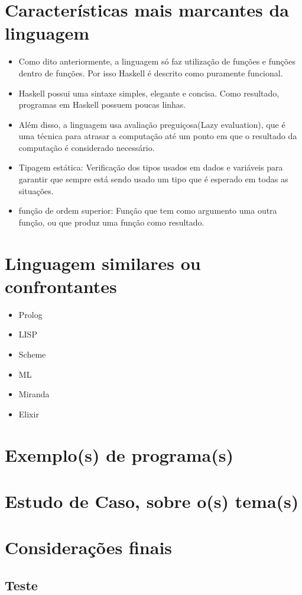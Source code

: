 \documentclass[
    article,			       %
    11pt,				         %
    oneside,			       %
    a4paper,			       %
    english,		       	 %
    brazil,			      	 %
    sumario=tradicional
	]{abntex2}
\begin{document}
    \chapter{Características mais marcantes da linguagem}

    \cite{abntex2-wiki-como-customizar}

    \begin{itemize}
      \item Como dito anteriormente, a linguagem só faz utilização de funções e funções dentro de funções. Por isso
      Haskell é descrito como puramente funcional.
      \item Haskell possui uma sintaxe simples, elegante e concisa. Como resultado, programas em Haskell possuem 
      poucas linhas. 
      \item Além disso, a linguagem usa avaliação preguiçosa(Lazy evaluation), que é uma técnica para atrasar a computação 
      até um ponto em que o resultado da computação é considerado necessário.
      \item Tipagem estática: Verificação dos tipos usados em dados e variáveis para 
      garantir que sempre está sendo usado um tipo que é esperado em todas as situações. 
      \item função de ordem superior: Função que tem como argumento uma outra função, ou que produz 
      uma função como resultado.
    \end{itemize}

    \chapter{Linguagem similares ou confrontantes}

    \begin{itemize}
      \item Prolog
      \item LISP 
      \item Scheme 
      \item ML 
      \item Miranda 
      \item Elixir 
    \end{itemize}

    \chapter{Exemplo(s) de programa(s)}
    \chapter{Estudo de Caso, sobre o(s) tema(s)}
    \chapter{Considerações finais}

    \newpage

    

    \begin{apendicesenv}

        \partapendices
        \chapter{Teste}
    
    \end{apendicesenv}
\end{document}

